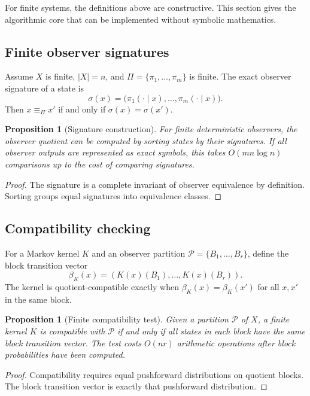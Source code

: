 \documentclass[11pt]{article}
\theoremstyle{definition}
\theoremstyle{plain}
\newtheorem{proposition}[definition]{Proposition}
\theoremstyle{remark}
\newcommand{\eqobs}{\equiv_{\Pi}}
\begin{document}
For finite systems, the definitions above are constructive. This section gives the algorithmic core that can be implemented without symbolic mathematics.

\subsection{Finite observer signatures}

Assume $X$ is finite, $|X|=n$, and $\Pi=\{\pi_1,\ldots,\pi_m\}$ is finite. The exact observer signature of a state is
\[
    \sigma(x)=\big(\pi_1(\cdot\mid x),\ldots,\pi_m(\cdot\mid x)\big).
\]
Then $x\eqobs x'$ if and only if $\sigma(x)=\sigma(x')$.

\begin{proposition}[Signature construction]
For finite deterministic observers, the observer quotient can be computed by sorting states by their signatures. If all observer outputs are represented as exact symbols, this takes $O(mn\log n)$ comparisons up to the cost of comparing signatures.
\end{proposition}

\begin{proof}
The signature is a complete invariant of observer equivalence by definition. Sorting groups equal signatures into equivalence classes.
\end{proof}

\subsection{Compatibility checking}

For a Markov kernel $K$ and an observer partition $\mathcal{P}=\{B_1,\ldots,B_r\}$, define the block transition vector
\[
    \beta_K(x)=\left(K(x)(B_1),\ldots,K(x)(B_r)\right).
\]
The kernel is quotient-compatible exactly when $\beta_K(x)=\beta_K(x')$ for all $x,x'$ in the same block.

\begin{proposition}[Finite compatibility test]
Given a partition $\mathcal{P}$ of $X$, a finite kernel $K$ is compatible with $\mathcal{P}$ if and only if all states in each block have the same block transition vector. The test costs $O(nr)$ arithmetic operations after block probabilities have been computed.
\end{proposition}

\begin{proof}
Compatibility requires equal pushforward distributions on quotient blocks. The block transition vector is exactly that pushforward distribution.
\end{proof}
\end{document}

